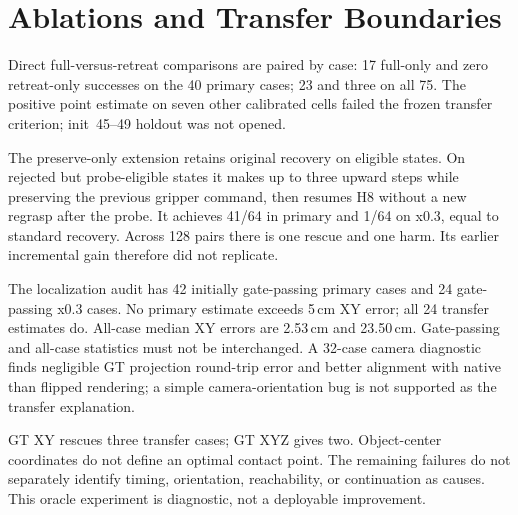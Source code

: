 \documentclass{article}
\begin{document}
\section{Ablations and Transfer Boundaries}
\label{app:bounds}
\begin{table}[ht]
\caption{P3d development ablation. Other calibrated cells are new to the
P3c intervention cohort, not unseen by perception.}
\centering\small
\end{table}
Direct full-versus-retreat comparisons are paired by case:
17 full-only and zero retreat-only successes on the 40 primary cases;
23 and three on all 75. The positive point estimate on seven other calibrated
cells failed the frozen transfer criterion; init~45--49 holdout was not opened.

\begin{table}[ht]
\caption{Latest confirmation: all four arms and both predeclared cohorts.
Transfer has eight x0.3 cells, tasks~1,2,4--9.}
\centering\small
\end{table}
The preserve-only extension retains original recovery on eligible states.
On rejected but probe-eligible states it makes up to three upward steps
while preserving the previous gripper command, then resumes H8 without a
new regrasp after the probe. It achieves 41/64 in primary and 1/64 on x0.3,
equal to standard recovery. Across 128 pairs there is one rescue and one harm.
Its earlier incremental gain therefore did not replicate.

The localization audit has 42 initially gate-passing primary cases and 24
gate-passing x0.3 cases. No primary estimate exceeds 5\,cm XY error; all 24
transfer estimates do. All-case median XY errors are 2.53\,cm and 23.50\,cm.
Gate-passing and all-case statistics must not be interchanged.
A 32-case camera diagnostic finds negligible GT projection round-trip error
and better alignment with native than flipped rendering; a simple
camera-orientation bug is not supported as the transfer explanation.

\begin{table}[ht]
\caption{Privileged grounding diagnostic, 16 cases per cohort.
Simulator coordinates replace predictions only in explicit oracle arms.}
\centering\small
\end{table}
GT XY rescues three transfer cases; GT XYZ gives two.
Object-center coordinates do not define an optimal contact point.
The remaining failures do not separately identify timing, orientation,
reachability, or continuation as causes.
This oracle experiment is diagnostic, not a deployable improvement.
\end{document}
